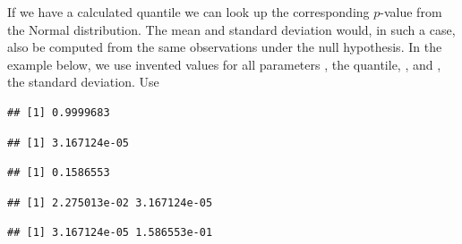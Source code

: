 \documentclass[krantz2]{krantz}\usepackage{knitr}
\begin{document}
If we have a calculated quantile we can look up the corresponding $p$-value from the Normal distribution. The mean and standard deviation would, in such a case, also be computed from the same observations under the null hypothesis. In the example below, we use invented values for all parameters , the quantile, , and , the standard deviation. Use

\begin{knitrout}\footnotesize
{}\color{fgcolor}\begin{kframe}
\begin{alltt}
\hlstd{(} \hlstd{=} \hlstd{,}  \hlstd{=} \hlstd{,}  \hlstd{=} \hlstd{)}
\end{alltt}
\begin{verbatim}
## [1] 0.9999683
\end{verbatim}
\begin{alltt}
\hlstd{(} \hlstd{=} \hlstd{,}  \hlstd{=} \hlstd{,}  \hlstd{=} \hlstd{,}  \hlstd{=} \hlstd{)}
\end{alltt}
\begin{verbatim}
## [1] 3.167124e-05
\end{verbatim}
\begin{alltt}
\hlstd{(} \hlstd{=} \hlstd{,}  \hlstd{=} \hlstd{,}  \hlstd{=} \hlstd{,}  \hlstd{=} \hlstd{)}
\end{alltt}
\begin{verbatim}
## [1] 0.1586553
\end{verbatim}
\begin{alltt}
\hlstd{(} \hlstd{=} \hlstd{(}\hlstd{,} \hlstd{),}  \hlstd{=} \hlstd{,}  \hlstd{=} \hlstd{,}  \hlstd{=} \hlstd{)}
\end{alltt}
\begin{verbatim}
## [1] 2.275013e-02 3.167124e-05
\end{verbatim}
\begin{alltt}
\hlstd{(} \hlstd{=} \hlstd{,}  \hlstd{=} \hlstd{,}  \hlstd{=} \hlstd{(}\hlstd{,} \hlstd{),}  \hlstd{=} \hlstd{)}
\end{alltt}
\begin{verbatim}
## [1] 3.167124e-05 1.586553e-01
\end{verbatim}
\end{kframe}
\end{knitrout}
\end{document}

